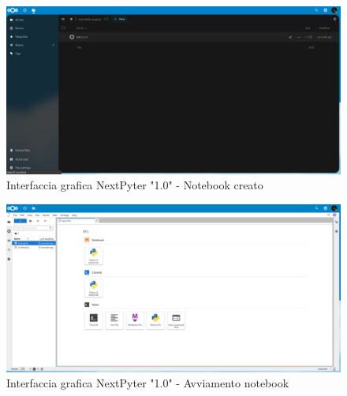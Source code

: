 \begin{figure}[h]
    \centering
    \includegraphics[width=1\textwidth]{files/images/example-nextpyter-1-3.png}
    \caption{Interfaccia grafica NextPyter "1.0" - Notebook creato}
    \label{fig:1.0-example-2}
\end{figure}
\begin{figure}[h]
    \centering
    \includegraphics[width=1\textwidth]{files/images/example-nextpyter-1-4.png}
    \caption{Interfaccia grafica NextPyter "1.0" - Avviamento notebook}
    \label{fig:1.0-example-2}
\end{figure}

